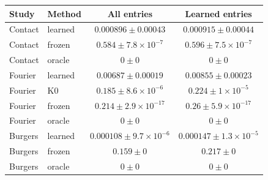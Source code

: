 \begin{tabular}{llcc}
\toprule Study & Method & All entries & Learned entries \\
\midrule
Contact & learned & $0.000896\pm0.00043$ & $0.000915\pm0.00044$ \\
Contact & frozen & $0.584\pm7.8\times10^{-7}$ & $0.596\pm7.5\times10^{-7}$ \\
Contact & oracle & $0\pm0$ & $0\pm0$ \\
Fourier & learned & $0.00687\pm0.00019$ & $0.00855\pm0.00023$ \\
Fourier & K0 & $0.185\pm8.6\times10^{-6}$ & $0.224\pm1\times10^{-5}$ \\
Fourier & frozen & $0.214\pm2.9\times10^{-17}$ & $0.26\pm5.9\times10^{-17}$ \\
Fourier & oracle & $0\pm0$ & $0\pm0$ \\
Burgers & learned & $0.000108\pm9.7\times10^{-6}$ & $0.000147\pm1.3\times10^{-5}$ \\
Burgers & frozen & $0.159\pm0$ & $0.217\pm0$ \\
Burgers & oracle & $0\pm0$ & $0\pm0$ \\
\bottomrule
\end{tabular}
